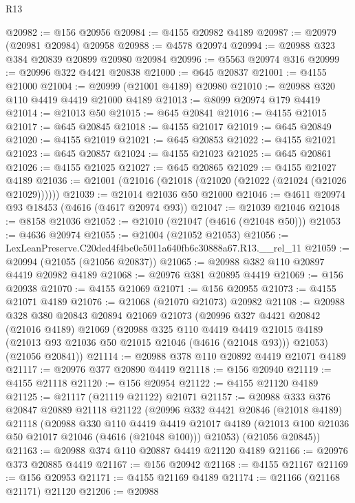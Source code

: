 \begin{lexlean}{R13}
\begin{coremodule}
@20982 := @156 @20956
@20984 := @4155 @20982 @4189
@20987 := @20979 (@20981 @20984) @20958
@20988 := @4578 @20974
@20994 := @20988 @323 @384 @20839 @20899 @20980 @20984
@20996 := @5563 @20974 @316
@20999 := @20996 @322 @4421 @20838
@21000 := @645 @20837
@21001 := @4155 @21000
@21004 := @20999 (@21001 @4189) @20980
@21010 := @20988 @320 @110 @4419 @4419 @21000 @4189
@21013 := @8099 @20974 @179 @4419
@21014 := @21013 @50
@21015 := @645 @20841
@21016 := @4155 @21015
@21017 := @645 @20845
@21018 := @4155 @21017
@21019 := @645 @20849
@21020 := @4155 @21019
@21021 := @645 @20853
@21022 := @4155 @21021
@21023 := @645 @20857
@21024 := @4155 @21023
@21025 := @645 @20861
@21026 := @4155 @21025
@21027 := @645 @20865
@21029 := @4155 @21027 @4189
@21036 := @21001 (@21016 (@21018 (@21020 (@21022 (@21024 (@21026 @21029))))))
@21039 := @21014 @21036 @50 @21000
@21046 := @4611 @20974 @93 @18453 (@4616 (@4617 @20974 @93))
@21047 := @21039 @21046
@21048 := @8158 @21036
@21052 := @21010 (@21047 (@4616 (@21048 @50)))
@21053 := @4636 @20974
@21055 := @21004 (@21052 @21053)
@21056 := LexLeanPreserve.C20ded4f4be0e5011a640fb6c30888a67.R13.__rel_11
@21059 := @20994 (@21055 (@21056 @20837))
@21065 := @20988 @382 @110 @20897 @4419 @20982 @4189
@21068 := @20976 @381 @20895 @4419
@21069 := @156 @20938
@21070 := @4155 @21069
@21071 := @156 @20955
@21073 := @4155 @21071 @4189
@21076 := @21068 (@21070 @21073) @20982
@21108 := @20988
    @328
    @380
    @20843
    @20894
    @21069
    @21073
    (@20996
      @327
      @4421
      @20842
      (@21016 @4189)
      @21069
      (@20988
        @325
        @110
        @4419
        @4419
        @21015
        @4189
        (@21013 @93 @21036 @50 @21015 @21046 (@4616 (@21048 @93)))
        @21053)
      (@21056 @20841))
@21114 := @20988 @378 @110 @20892 @4419 @21071 @4189
@21117 := @20976 @377 @20890 @4419
@21118 := @156 @20940
@21119 := @4155 @21118
@21120 := @156 @20954
@21122 := @4155 @21120 @4189
@21125 := @21117 (@21119 @21122) @21071
@21157 := @20988
    @333
    @376
    @20847
    @20889
    @21118
    @21122
    (@20996
      @332
      @4421
      @20846
      (@21018 @4189)
      @21118
      (@20988
        @330
        @110
        @4419
        @4419
        @21017
        @4189
        (@21013 @100 @21036 @50 @21017 @21046 (@4616 (@21048 @100)))
        @21053)
      (@21056 @20845))
@21163 := @20988 @374 @110 @20887 @4419 @21120 @4189
@21166 := @20976 @373 @20885 @4419
@21167 := @156 @20942
@21168 := @4155 @21167
@21169 := @156 @20953
@21171 := @4155 @21169 @4189
@21174 := @21166 (@21168 @21171) @21120
@21206 := @20988

\end{coremodule}
\end{lexlean}
